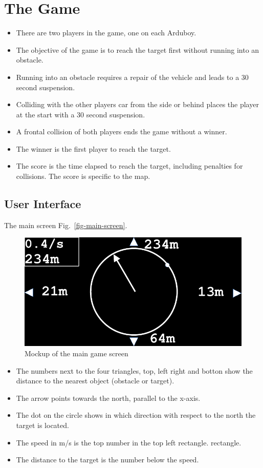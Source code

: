\documentclass[11pt]{article}
\newcommand{\figref}[1]{Fig.~\eqref{#1}}
\begin{document}
\section{The Game}
\label{sec-the-game}
\begin{itemize}
    \item There are two players in the game, one on each Arduboy.
    \item The objective of the game is to reach the target first without
        running into an obstacle.
    \item Running into an obstacle requires a repair of the vehicle and leads
        to a 30 second suspension.
    \item Colliding with the other players car from the side or behind places
        the player at the start with a 30 second suspension.
    \item A frontal collision of both players ends the game without a winner.
    \item The winner is the first player to reach the target.
    \item The score is the time elapsed to reach the target, including
        penalties for collisions. The score is specific to the map.
\end{itemize}

\subsection{User Interface}
\label{sec-user-interface}
The main screen \figref{fig-main-screen}.
\begin{figure}
    \includegraphics[width=\textwidth]{odg/screen.pdf}
\caption{Mockup of the main game screen}\label{fig-main-screen}
\end{figure}
\begin{itemize}
    \item The numbers next to the four triangles, top, left right and botton
        show the distance to the nearest object (obstacle or target).
    \item The arrow points towards the north, parallel to the x-axis.
    \item The dot on the circle shows in which direction with respect to the
        north the target is located.
    \item The speed in m/s is the top number in the top left rectangle.
        rectangle.
    \item The distance to the target is the number below the speed.
\end{itemize}
\end{document}
